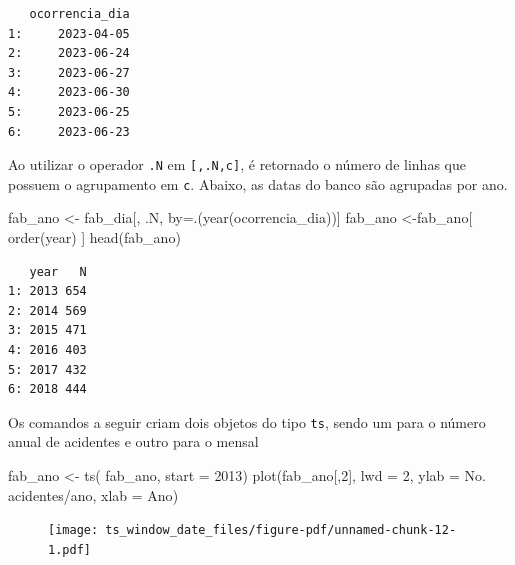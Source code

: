 \documentclass[
  letterpaper,
  DIV=11,
  numbers=noendperiod]{scrartcl}
\newenvironment{Shaded}{\begin{snugshade}}{\end{snugshade}}
\newcommand{\AttributeTok}[1]{\textcolor[rgb]{0.40,0.45,0.13}{#1}}
\newcommand{\DecValTok}[1]{\textcolor[rgb]{0.68,0.00,0.00}{#1}}
\newcommand{\FunctionTok}[1]{\textcolor[rgb]{0.28,0.35,0.67}{#1}}
\newcommand{\NormalTok}[1]{\textcolor[rgb]{0.00,0.23,0.31}{#1}}
\newcommand{\OtherTok}[1]{\textcolor[rgb]{0.00,0.23,0.31}{#1}}
\newcommand{\StringTok}[1]{\textcolor[rgb]{0.13,0.47,0.30}{#1}}
\theoremstyle{plain}
\theoremstyle{plain}
\theoremstyle{definition}
\theoremstyle{definition}
\theoremstyle{remark}
\begin{document}
\begin{verbatim}
   ocorrencia_dia
1:     2023-04-05
2:     2023-06-24
3:     2023-06-27
4:     2023-06-30
5:     2023-06-25
6:     2023-06-23
\end{verbatim}

Ao utilizar o operador \texttt{.N} em \texttt{{[},.N,c{]}}, é retornado
o número de linhas que possuem o agrupamento em \texttt{c}. Abaixo, as
datas do banco são agrupadas por ano.

\begin{Shaded}
\begin{Highlighting}[]
\NormalTok{fab\_ano }\OtherTok{\textless{}{-}}\NormalTok{ fab\_dia[, .N, by}\OtherTok{=}\NormalTok{.(}\FunctionTok{year}\NormalTok{(ocorrencia\_dia))]}
\NormalTok{fab\_ano }\OtherTok{\textless{}{-}}\NormalTok{fab\_ano[ }\FunctionTok{order}\NormalTok{(year) ]}
\FunctionTok{head}\NormalTok{(fab\_ano)}
\end{Highlighting}
\end{Shaded}

\begin{verbatim}
   year   N
1: 2013 654
2: 2014 569
3: 2015 471
4: 2016 403
5: 2017 432
6: 2018 444
\end{verbatim}

Os comandos a seguir criam dois objetos do tipo \texttt{ts}, sendo um
para o número anual de acidentes e outro para o mensal

\begin{Shaded}
\begin{Highlighting}[]
\NormalTok{fab\_ano }\OtherTok{\textless{}{-}} \FunctionTok{ts}\NormalTok{( fab\_ano, }\AttributeTok{start =} \DecValTok{2013}\NormalTok{)}
\FunctionTok{plot}\NormalTok{(fab\_ano[,}\DecValTok{2}\NormalTok{], }\AttributeTok{lwd =} \DecValTok{2}\NormalTok{, }\AttributeTok{ylab =} \StringTok{\textquotesingle{}No. acidentes/ano\textquotesingle{}}\NormalTok{, }\AttributeTok{xlab =} \StringTok{\textquotesingle{}Ano\textquotesingle{}}\NormalTok{)}
\end{Highlighting}
\end{Shaded}

\begin{figure}[H]

{\centering \texttt{[image: ts\_window\_date\_files/figure-pdf/unnamed-chunk-12-1.pdf]}

}

\end{figure}
\end{document}
